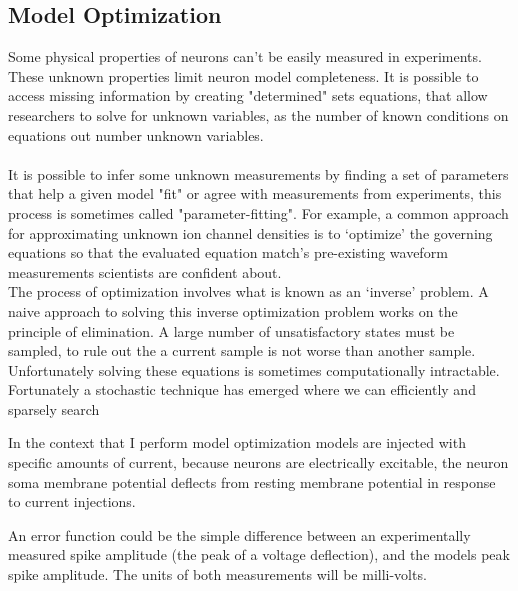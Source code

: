 \subsection{Model Optimization}
%
Some physical properties of neurons can’t be easily measured in experiments. These unknown properties limit neuron model completeness. It is possible to access missing information by creating "determined" sets equations, that allow researchers to solve for unknown variables, as the number of known conditions on equations out number unknown variables.\\
\\
It is possible to infer some unknown measurements by finding a set of parameters that help a given model "fit" or agree with measurements from experiments, this process is sometimes called "parameter-fitting". For example, a common approach for approximating unknown ion channel densities is to ‘optimize’ the governing equations so that the evaluated equation  match's pre-existing waveform measurements scientists are confident about. 
\\
The process of optimization involves what is known as an ‘inverse’ problem. A naive approach to solving this inverse optimization problem works on the principle of elimination. A large number of unsatisfactory states must be sampled, to rule out the a current sample is not worse than another sample. Unfortunately solving these equations is sometimes computationally intractable.\\

Fortunately a stochastic technique has emerged where we can efficiently and sparsely search


In the context that I perform model optimization models are injected with specific amounts of current, because neurons are electrically excitable, the neuron soma membrane potential deflects from resting membrane potential in response to current injections.

An error function could be the simple difference between an experimentally measured spike amplitude (the peak of a voltage deflection), and the models peak spike amplitude. The units of both measurements will be milli-volts.  


